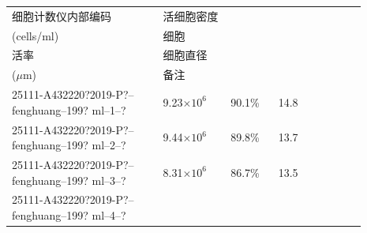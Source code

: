 \documentclass[UTF8,10pt,a4paper,fontset=fandol]{ctexart}
\newcommand{\fieldvalue}[1]{#1}
\newcommand{\handwritten}[1]{#1}
\begin{document}
\begin{center}
\begin{tabular}{|p{0.38\linewidth}|p{0.17\linewidth}|p{0.12\linewidth}|p{0.13\linewidth}|p{0.09\linewidth}|}
\hline
\centering 细胞计数仪内部编码 &
\centering 活细胞密度\\(cells/ml) &
\centering 细胞\\活率 &
\centering 细胞直径\\($\mu$m) &
\centering 备注
\\ \hline
\fieldvalue{\handwritten{\scriptsize 25111-A432220?2019-P?--fenghuang--199? ml--1--?}}
&
\fieldvalue{\handwritten{9.23}}\(\times10^{6}\)
&
\fieldvalue{\handwritten{90.1}}\%
&
\fieldvalue{\handwritten{14.8}}
&
\\ \hline
\fieldvalue{\handwritten{\scriptsize 25111-A432220?2019-P?--fenghuang--199? ml--2--?}}
&
\fieldvalue{\handwritten{9.44}}\(\times10^{6}\)
&
\fieldvalue{\handwritten{89.8}}\%
&
\fieldvalue{\handwritten{13.7}}
&
\\ \hline
\fieldvalue{\handwritten{\scriptsize 25111-A432220?2019-P?--fenghuang--199? ml--3--?}}
&
\fieldvalue{\handwritten{8.31}}\(\times10^{6}\)
&
\fieldvalue{\handwritten{86.7}}\%
&
\fieldvalue{\handwritten{13.5}}
&
\\ \hline
\fieldvalue{\handwritten{\scriptsize 25111-A432220?2019-P?--fenghuang--199? ml--4--?}}

\end{tabular}
\end{center}
\end{document}

